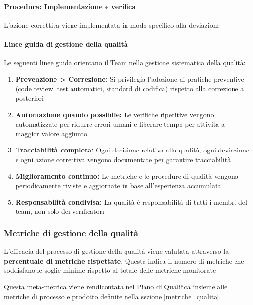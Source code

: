 \documentclass[a4paper,12pt]{article}
\begin{document}
\paragraph{Procedura: Implementazione e verifica}
L'azione correttiva viene implementata in modo specifico alla deviazione

\paragraph{Linee guida di gestione della qualità}
Le seguenti linee guida orientano il Team nella gestione sistematica della
qualità:
\begin{enumerate}
    \item \textbf{Prevenzione > Correzione:} Si privilegia l'adozione di pratiche preventive (code review, test automatici, standard di codifica) rispetto alla correzione a posteriori
    \item \textbf{Automazione quando possibile:} Le verifiche ripetitive vengono automatizzate per ridurre errori umani e liberare tempo per attività a maggior valore aggiunto
    \item \textbf{Tracciabilità completa:} Ogni decisione relativa alla qualità, ogni deviazione e ogni azione correttiva vengono documentate per garantire tracciabilità
    \item \textbf{Miglioramento continuo:} Le metriche e le procedure di qualità vengono periodicamente riviste e aggiornate in base all'esperienza accumulata
    \item \textbf{Responsabilità condivisa:} La qualità è responsabilità di tutti i membri del team, non solo dei verificatori
\end{enumerate}

\subsubsection{Metriche di gestione della qualità}\label{metriche_gestione_qualita}
L'efficacia del processo di gestione della qualità viene valutata attraverso la
\textbf{percentuale di metriche rispettate}. Questa indica il numero di
metriche che soddisfano le soglie minime rispetto al totale delle metriche
monitorate

Questa meta-metrica viene rendicontata nel Piano di Qualifica insieme alle
metriche di processo e prodotto definite nella sezione \ref{metriche_qualita}.
\end{document}

